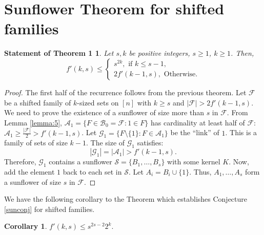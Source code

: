 \documentclass[runningheads,12pt,a4paper]{article}
\newtheorem{corollary}{Corollary}
\newtheorem*{statement}{Statement of Theorem 1}
\newtheorem*{statementA}{Statement of Theorem 2}
\begin{document}
\section{Sunflower Theorem for shifted families}

\begin{statement}
	Let $s,k$ be  positive integers, $s \geq 1$, $k \geq 1$. Then, $$f'(k,s) \leq \begin{cases}
		s^{2k}, \text{ if $k\le s-1$,}\\
		2f'(k-1,s), \text{ Otherwise.}
	\end{cases}$$
\end{statement}

\begin{proof}
	The first half of the recurrence follows from the previous theorem.
	Let $\mathcal{F}$ be a shifted family of $k$-sized sets on $[n]$ with $k\geq s$ and $|\mathcal{F}| > 2f'(k-1,s)$. We need to prove the existence of a sunflower of size more than $s$ in $\mathcal{F}$. From Lemma \ref{lemma:5},
	$\mathcal{A}_1=\{F \in \mathcal{B}_{0}=\mathcal{F} : 1 \in F\}$ has cardinality at least half of $\mathcal{F}$:
	$\mathcal{A}_1 \geq \frac{|\mathcal{F}|}{2}>f'(k-1,s)$.
	Let $\mathcal{G}_1 = \{ F \setminus \{1\} : F \in \mathcal{A}_1\}$ be the ``link'' of $1$. This is a family of sets of size $k-1$. The size of $\mathcal{G}_1$ satisfies:$$|\mathcal{G}_1| =|\mathcal{A}_1| >f'(k-1,s).$$ 
	Therefore, $\mathcal{G}_1$ contains a sunflower $\mathcal{S} = \{B_1, \dots, B_{s}\}$ with some kernel $K$.
	Now, add the element $1$ back to each set in $\mathcal{S}$. Let $A_i = B_i \cup \{1\}$. Thus, $A_1, \dots, A_{s}$ form a sunflower of size $s$ in $\mathcal{F}$.
\end{proof}

We have the following corollary to the Theorem which establishes Conjecture \ref{sunconj} for shifted families.
\begin{corollary}\label{cor:1}
	$f'(k,s) \leq s^{2s-2}2^{k}.$
\end{corollary}	

%
%
\end{document}
